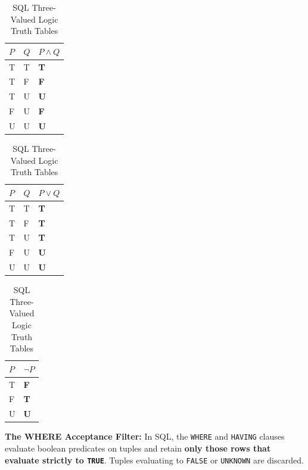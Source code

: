 \begin{table}[htbp]
\centering
\small
\caption{SQL Three-Valued Logic Truth Tables}
\label{tab:3vl_truth_tables}
\begin{minipage}{0.32\textwidth}
\centering
\begin{tabular}{l l l}
\toprule
$P$ & $Q$ & $P \land Q$ \\
\midrule
T & T & \textbf{T} \\
T & F & \textbf{F} \\
T & U & \textbf{U} \\
F & U & \textbf{F} \\
U & U & \textbf{U} \\
\bottomrule
\end{tabular}
\end{minipage}
\hfill
\begin{minipage}{0.32\textwidth}
\centering
\begin{tabular}{l l l}
\toprule
$P$ & $Q$ & $P \lor Q$ \\
\midrule
T & T & \textbf{T} \\
T & F & \textbf{T} \\
T & U & \textbf{T} \\
F & U & \textbf{U} \\
U & U & \textbf{U} \\
\bottomrule
\end{tabular}
\end{minipage}
\hfill
\begin{minipage}{0.32\textwidth}
\centering
\begin{tabular}{l l}
\toprule
$P$ & $\neg P$ \\
\midrule
T & \textbf{F} \\
F & \textbf{T} \\
U & \textbf{U} \\
\bottomrule
\end{tabular}
\end{minipage}
\end{table}

\textbf{The WHERE Acceptance Filter:} In SQL, the \texttt{WHERE} and \texttt{HAVING} clauses evaluate boolean predicates on tuples and retain \textbf{only those rows that evaluate strictly to \texttt{TRUE}}. Tuples evaluating to \texttt{FALSE} or \texttt{UNKNOWN} are discarded.

